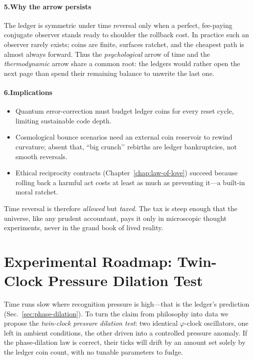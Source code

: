 \documentclass[11pt,oneside]{book}
\begin{document}
\paragraph*{5.\;Why the arrow persists}

The ledger is symmetric under time reversal only when a perfect,
fee-paying conjugate observer stands ready to shoulder the rollback
cost.  
In practice such an observer rarely exists; coins are finite, surfaces
ratchet, and the cheapest path is almost always forward.  
Thus the \emph{psychological} arrow of time and the \emph{thermodynamic}
arrow share a common root: the ledgers would rather open the next page
than spend their remaining balance to unwrite the last one.

\paragraph*{6.\;Implications}

\begin{itemize}
\item Quantum error-correction must budget ledger coins for every reset
  cycle, limiting sustainable code depth.
\item Cosmological bounce scenarios need an external coin reservoir to
  rewind curvature; absent that, “big crunch’’ rebirths are ledger
  bankruptcies, not smooth reversals.
\item Ethical reciprocity contracts (Chapter~\ref{chap:law-of-love})
  succeed because rolling back a harmful act costs at least as much as
  preventing it—a built-in moral ratchet.
\end{itemize}

Time reversal is therefore \emph{allowed} but \emph{taxed}.  
The tax is steep enough that the universe, like any prudent accountant,
pays it only in microscopic thought experiments, never in the grand
book of lived reality.

\section{Experimental Roadmap: Twin-Clock Pressure Dilation Test}
\label{sec:twin-clock-roadmap}

Time runs slow where recognition pressure is high—that is the ledger’s prediction (Sec.~\ref{sec:phase-dilation}).  To turn the claim from philosophy into data we propose the \emph{twin-clock pressure dilation test}: two identical $\varphi$-clock oscillators, one left in ambient conditions, the other driven into a controlled pressure anomaly.  If the phase-dilation law is correct, their ticks will drift by an amount set solely by the ledger coin count, with no tunable parameters to fudge.
\end{document}
